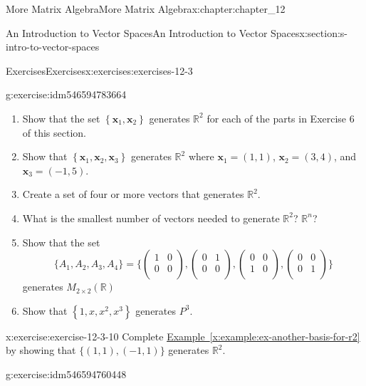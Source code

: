 \documentclass[oneside,10pt,]{book}
\newcommand{\xreffont}{\relax}
\numberwithin{equation}{section}
\renewcommand{\vec}[1]{\mathbf{#1}}
\begin{document}
\begin{chapterptx}{More Matrix Algebra}{}{More Matrix Algebra}{}{}{x:chapter:chapter_12}
\begin{sectionptx}{An Introduction to Vector Spaces}{}{An Introduction to Vector Spaces}{}{}{x:section:s-intro-to-vector-spaces}
\begin{exercises-subsection}{Exercises}{}{Exercises}{}{}{x:exercises:exercises-12-3}
\begin{divisionexercise}{9}{}{}{g:exercise:idm546594783664}
%
\begin{enumerate}[label=(\alph*)]
\item{}Show that the set \(\left\{\vec{x}_1,\vec{x}_2\right\}\) generates \(\mathbb{R}^2\) for each of the parts in Exercise 6 of this section.%
\item{}Show that \(\left\{\vec{x}_1,\vec{x}_2,\vec{x}_3\right\}\) generates \(\mathbb{R}^2\) where \(\vec{x}_1= (1, 1)\), \(\vec{x}_2= (3,4)\), and \(\vec{x}_3 = (-1, 5)\).%
\item{}Create a set of four or more vectors that generates \(\mathbb{R}^2\).%
\item{}What is the smallest number of vectors needed to generate \(\mathbb{R}^2\)?   \(\mathbb{R}^n\)?%
\item{}Show that the set%
\begin{equation*}
\{A_1, A_2 ,A_3, A_4\} =\{
\left(
\begin{array}{cc}
1 & 0 \\
0 & 0 \\
\end{array}
\right),
\left(
\begin{array}{cc}
0 & 1 \\
0 & 0 \\
\end{array}
\right),
\left(
\begin{array}{cc}
0 & 0 \\
1 & 0 \\
\end{array}
\right),
\left(
\begin{array}{cc}
0 & 0 \\
0 & 1 \\
\end{array}
\right)\}
\end{equation*}
generates \(M_{2\times 2}(\mathbb{R})\)%
\item{}Show that \(\left\{1,x,x^2 ,x^3\right\}\) generates \(P^3\).%
\end{enumerate}
%
\end{divisionexercise}%
\begin{divisionexercise}{10}{}{}{x:exercise:exercise-12-3-10}%
Complete \hyperref[x:example:ex-another-basis-for-r2]{Example~{\xreffont\ref{x:example:ex-another-basis-for-r2}}} by showing that \(\{(1, 1), (-1, 1)\}\) generates \(\mathbb{R}^2\).%
\end{divisionexercise}%
\begin{divisionexercise}{11}{}{}{g:exercise:idm546594760448}%
%
\begin{enumerate}[label=(\alph*)]

\end{enumerate}
\end{divisionexercise}
\end{exercises-subsection}
\end{sectionptx}
\end{chapterptx}
\end{document}
